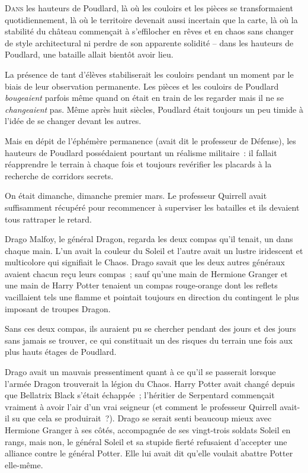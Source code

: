 
\lettrine{D}{ans} les hauteurs de Poudlard, là où les couloirs et les pièces se transformaient quotidiennement, là où le territoire devenait aussi incertain que la carte, là où la stabilité du château commençait à s'effilocher en rêves et en chaos sans changer de style architectural ni perdre de son apparente solidité -- dans les hauteurs de Poudlard, une bataille allait bientôt avoir lieu.

La présence de tant d'élèves stabiliserait les couloirs pendant un moment par le biais de leur observation permanente.
Les pièces et les couloirs de Poudlard \emph{bougeaient} parfois même quand on était en train de les regarder mais il ne se \emph{changeaient} pas.
Même après huit siècles, Poudlard était toujours un peu timide à l'idée de se changer devant les autres.

Mais en dépit de l'éphémère permanence (avait dit le professeur de Défense), les hauteurs de Poudlard possédaient pourtant un réalisme militaire~: il fallait réapprendre le terrain à chaque fois et toujours revérifier les placards à la recherche de corridors secrets.

On était dimanche, dimanche premier mars.
Le professeur Quirrell avait suffisamment récupéré pour recommencer à superviser les batailles et ils devaient tous rattraper le retard.

Drago Malfoy, le général Dragon, regarda les deux compas qu'il tenait, un dans chaque main.
L'un avait la couleur du Soleil et l'autre avait un lustre iridescent et multicolore qui signifiait le Chaos.
Drago savait que les deux autres généraux avaient chacun reçu leurs compas~; sauf qu'une main de Hermione Granger et une main de Harry Potter tenaient un compas rouge-orange dont les reflets vacillaient tels une flamme et pointait toujours en direction du contingent le plus imposant de troupes Dragon.

Sans ces deux compas, ils auraient pu se chercher pendant des jours et des jours sans jamais se trouver, ce qui constituait un des risques du terrain une fois aux plus hauts étages de Poudlard.

Drago avait un mauvais pressentiment quant à ce qu'il se passerait lorsque l'armée Dragon trouverait la légion du Chaos.
Harry Potter avait changé depuis que Bellatrix Black s'était échappée~; l'héritier de Serpentard commençait vraiment à avoir l'air d'un vrai seigneur (et comment le professeur Quirrell avait-il su que cela se produirait~?).
Drago se serait senti beaucoup mieux avec Hermione Granger à ses côtés, accompagnée de ses vingt-trois soldats Soleil en rangs, mais non, le général Soleil et sa stupide fierté refusaient d'accepter une alliance contre le général Potter.
Elle lui avait dit qu'elle voulait abattre Potter elle-même.

